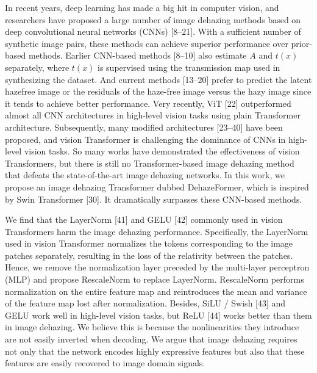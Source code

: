 \documentclass{article}
\begin{document}
In recent years, deep learning has made a big hit in computer vision, and researchers have proposed a large number of image dehazing methods based on deep convolutional neural networks (CNNs) [8–21]. With a sufficient number of synthetic image pairs, these methods can achieve superior performance over prior-based methods. Earlier CNN-based methods [8–10] also estimate $A$ and $t(x)$ separately, where $t(x)$ is supervised using the transmission map used in synthesizing the dataset. And current methods [13–20] prefer to predict the latent hazefree image or the residuals of the haze-free image versus the hazy image since it tends to achieve better performance. Very recently, ViT [22] outperformed almost all CNN architectures in high-level vision tasks using plain Transformer architecture. Subsequently, many modified architectures [23–40] have been proposed, and vision Transformer is challenging the dominance of CNNs in high-level vision tasks. So many works have demonstrated the effectiveness of vision Transformers, but there is still no Transformer-based image dehazing method that defeats the state-of-the-art image dehazing networks. In this work, we propose an image dehazing Transformer dubbed DehazeFormer, which is inspired by Swin Transformer [30]. It dramatically surpasses these CNN-based methods.


We find that the LayerNorm [41] and GELU [42] commonly used in vision Transformers harm the image dehazing performance. Specifically, the LayerNorm used in vision Transformer normalizes the tokens corresponding to the image patches separately, resulting in the loss of the relativity between the patches. Hence, we remove the normalization layer preceded by the multi-layer perceptron (MLP) and propose RescaleNorm to replace LayerNorm. RescaleNorm performs normalization on the entire feature map and reintroduces the mean and variance of the feature map lost after normalization. Besides, SiLU / Swish [43] and GELU work well in high-level vision tasks, but ReLU [44] works better than them in image dehazing. We believe this is because the nonlinearities they introduce are not easily inverted when decoding. We argue that image dehazing requires not only that the network encodes highly expressive features but also that these features are easily recovered to image domain signals.
\end{document}
